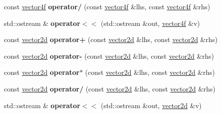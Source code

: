 \begin{DoxyCompactItemize}
\item 
\hypertarget{namespacesimd_a707ea1de9b3077dc37c01eddf97f73d4}{const \hyperlink{classsimd_1_1vector4f}{vector4f} {\bfseries operator/} (const \hyperlink{classsimd_1_1vector4f}{vector4f} \&lhs, const \hyperlink{classsimd_1_1vector4f}{vector4f} \&rhs)}\label{namespacesimd_a707ea1de9b3077dc37c01eddf97f73d4}

\item 
\hypertarget{namespacesimd_a2d02fd55c5ac17856ef9c31e6b942f64}{std\+::ostream \& {\bfseries operator$<$$<$} (std\+::ostream \&out, \hyperlink{classsimd_1_1vector4f}{vector4f} \&v)}\label{namespacesimd_a2d02fd55c5ac17856ef9c31e6b942f64}

\item 
\hypertarget{namespacesimd_ae5242136c4ed61581b6a1767e6c3b39f}{const \hyperlink{classsimd_1_1vector2d}{vector2d} {\bfseries operator+} (const \hyperlink{classsimd_1_1vector2d}{vector2d} \&lhs, const \hyperlink{classsimd_1_1vector2d}{vector2d} \&rhs)}\label{namespacesimd_ae5242136c4ed61581b6a1767e6c3b39f}

\item 
\hypertarget{namespacesimd_a701a4758b16084f29e42a359706e2da2}{const \hyperlink{classsimd_1_1vector2d}{vector2d} {\bfseries operator-\/} (const \hyperlink{classsimd_1_1vector2d}{vector2d} \&lhs, const \hyperlink{classsimd_1_1vector2d}{vector2d} \&rhs)}\label{namespacesimd_a701a4758b16084f29e42a359706e2da2}

\item 
\hypertarget{namespacesimd_a870c8124715ae2e8af34208d51010e00}{const \hyperlink{classsimd_1_1vector2d}{vector2d} {\bfseries operator$\ast$} (const \hyperlink{classsimd_1_1vector2d}{vector2d} \&lhs, const \hyperlink{classsimd_1_1vector2d}{vector2d} \&rhs)}\label{namespacesimd_a870c8124715ae2e8af34208d51010e00}

\item 
\hypertarget{namespacesimd_a115a38d9676d5fce72810ad9af920775}{const \hyperlink{classsimd_1_1vector2d}{vector2d} {\bfseries operator/} (const \hyperlink{classsimd_1_1vector2d}{vector2d} \&lhs, const \hyperlink{classsimd_1_1vector2d}{vector2d} \&rhs)}\label{namespacesimd_a115a38d9676d5fce72810ad9af920775}

\item 
\hypertarget{namespacesimd_a548e288c76ef998059646f66bf85f2c5}{std\+::ostream \& {\bfseries operator$<$$<$} (std\+::ostream \&out, \hyperlink{classsimd_1_1vector2d}{vector2d} \&v)}\label{namespacesimd_a548e288c76ef998059646f66bf85f2c5}

\end{DoxyCompactItemize}


